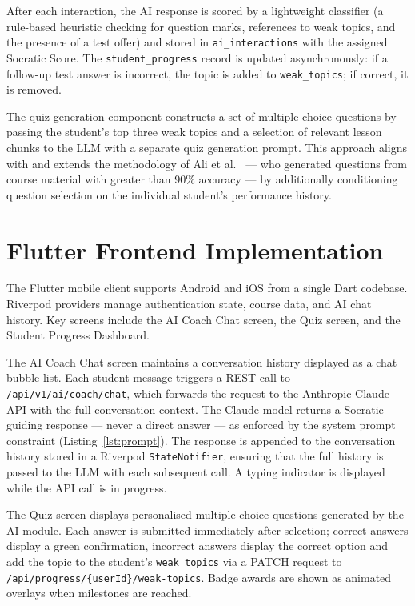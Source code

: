 \documentclass[12pt,a4paper]{report}
\begin{document}
After each interaction, the AI response is scored by a lightweight classifier (a rule-based
heuristic checking for question marks, references to weak topics, and the presence of a
test offer) and stored in \texttt{ai\_interactions} with the assigned Socratic Score. The
\texttt{student\_progress} record is updated asynchronously: if a follow-up test answer is
incorrect, the topic is added to \texttt{weak\_topics}; if correct, it is removed.

The quiz generation component constructs a set of multiple-choice questions by passing the
student's top three weak topics and a selection of relevant lesson chunks to the LLM with a
separate quiz generation prompt. This approach aligns with and extends the methodology of
Ali et al.~\cite{ref10} --- who generated questions from course material with greater than
90\% accuracy --- by additionally conditioning question selection on the individual
student's performance history.

\section{Flutter Frontend Implementation}

The Flutter mobile client supports Android and iOS from a single Dart codebase. Riverpod
providers manage authentication state, course data, and AI chat history. Key screens
include the AI Coach Chat screen, the Quiz screen, and the Student Progress Dashboard.

The AI Coach Chat screen maintains a conversation history displayed as a chat bubble list.
Each student message triggers a REST call to \texttt{/api/v1/ai/coach/chat}, which forwards
the request to the Anthropic Claude API with the full conversation context. The Claude
model returns a Socratic guiding response --- never a direct answer --- as enforced by the
system prompt constraint (Listing~\ref{lst:prompt}). The response is appended to the
conversation history stored in a Riverpod \texttt{StateNotifier}, ensuring that the full
history is passed to the LLM with each subsequent call. A typing indicator is displayed
while the API call is in progress.

The Quiz screen displays personalised multiple-choice questions generated by the AI module.
Each answer is submitted immediately after selection; correct answers display a green
confirmation, incorrect answers display the correct option and add the topic to the
student's \texttt{weak\_topics} via a PATCH request to
\texttt{/api/progress/\{userId\}/weak-topics}. Badge awards are shown as animated overlays
when milestones are reached.
\end{document}
